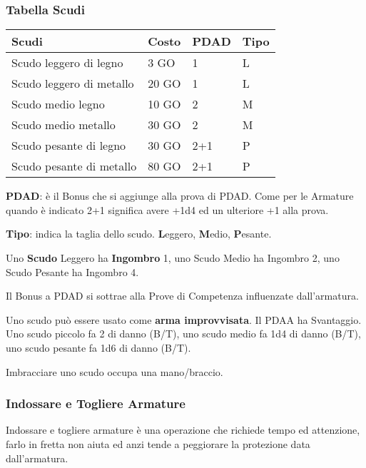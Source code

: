 \documentclass[12pt,a4paper,twoside,openany]{book}
\begin{document}
\subsubsection{Tabella Scudi}

\label{tabella-scudi}

\begin{center}
	\begin{tabular}{llll}
\textbf{Scudi} & \textbf{Costo} & \textbf{PDAD} & \textbf{Tipo}\\
\toprule
Scudo leggero di legno 		& 3 GO   &  1	& L\\
Scudo leggero di metallo 	& 20 GO  &  1 	& L\\
Scudo medio legno			& 10 GO  &  2	& M\\
Scudo medio metallo 		& 30 GO  &  2  	& M\\
Scudo pesante di legno 		& 30 GO  &  2+1 & P\\
Scudo pesante di metallo	& 80 GO  &  2+1 & P\\
\end{tabular}

\end{center}

\begin{multicols}{2}

\medskip

\textbf{PDAD}: è il Bonus che si aggiunge alla prova di PDAD. Come per le Armature quando è indicato 2+1 significa avere +1d4 ed un ulteriore +1 alla prova.

\textbf{Tipo}: indica la taglia dello scudo. \textbf{L}eggero, \textbf{M}edio, \textbf{P}esante.

Uno \textbf{Scudo} Leggero ha \textbf{Ingombro} 1, uno Scudo Medio ha Ingombro 2, uno Scudo Pesante ha Ingombro 4.

Il Bonus a PDAD si sottrae alla Prove di Competenza influenzate dall'armatura.

Uno scudo può essere usato come \textbf{arma improvvisata}. Il PDAA ha Svantaggio. Uno scudo piccolo fa 2 di danno (B/T), uno scudo medio fa 1d4 di danno (B/T), uno scudo pesante fa 1d6 di danno (B/T).

Imbracciare uno scudo occupa una mano/braccio.

\subsubsection{Indossare e Togliere Armature}

Indossare e togliere armature è una operazione che richiede tempo ed attenzione, farlo in fretta non aiuta ed anzi tende a peggiorare la protezione data dall'armatura.

\end{multicols}
\end{document}
